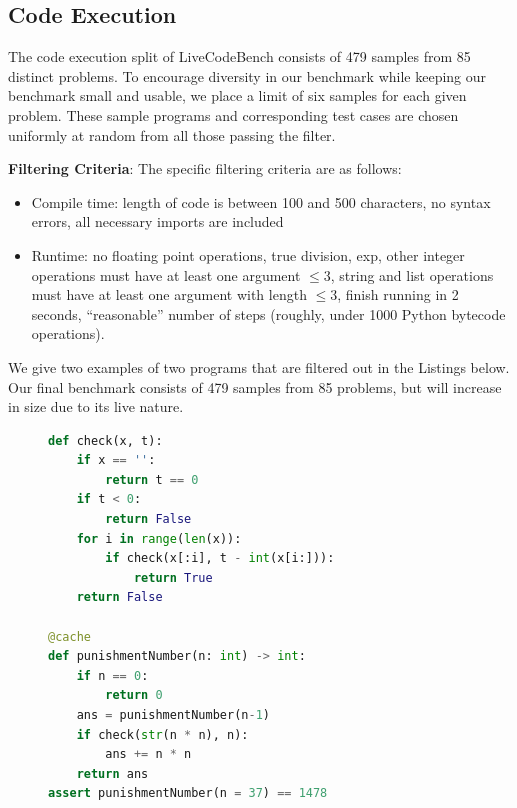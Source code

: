 \subsection{Code Execution} \label{appendix:dataset-execution}
The code execution split of LiveCodeBench consists of 479 samples from 85 distinct problems. To encourage diversity in our benchmark while keeping our benchmark small and usable, we place a limit of six samples for each given problem. These sample programs and corresponding test cases are chosen uniformly at random from all those passing the filter.

\textbf{Filtering Criteria}: The specific filtering criteria are as follows:
\begin{itemize}
\item Compile time: length of code is between 100 and 500 characters, no syntax errors, all necessary imports are included

\item Runtime: no floating point operations, true division, exp, other integer operations must have at least one argument $\le 3$, string and list operations must have at least one argument with length $\le 3$, finish running in 2 seconds, ``reasonable'' number of steps (roughly, under 1000 Python bytecode operations).
\end{itemize}

We give two examples of two programs that are filtered out in the Listings below. Our final benchmark consists of 479 samples from 85 problems, but will increase in size due to its live nature.

\begin{figure}[h!]
\centering
\begin{tcolorbox}[enhanced,size=small,colback=black!5!white,colframe=RoyalBlue,flip title={interior hidden},title={Program filtered because of multiplication}]
\begin{lstlisting}[label={}, captionpos=b, breaklines=true, language=Python]
def check(x, t):
    if x == '':
        return t == 0
    if t < 0:
        return False
    for i in range(len(x)):
        if check(x[:i], t - int(x[i:])):
            return True
    return False

@cache
def punishmentNumber(n: int) -> int:
    if n == 0:
        return 0
    ans = punishmentNumber(n-1)
    if check(str(n * n), n):
        ans += n * n
    return ans
assert punishmentNumber(n = 37) == 1478
\end{lstlisting}
\end{tcolorbox}
\end{figure}

